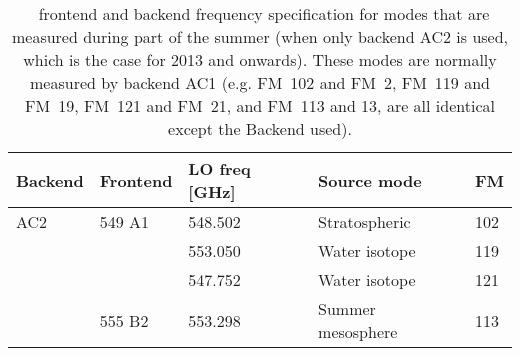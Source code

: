 \begin{table}[tbhp]
\centering
\caption{\smr\ frontend and backend frequency specification for modes that are
    measured during part of the summer (when only backend AC2 is used, which is
    the case for 2013 and onwards).
    These modes are normally measured by backend AC1 (e.g. FM~102 and FM~2,
    FM~119 and FM~19, FM~121 and FM~21, and FM~113 and 13, are all identical
    except the Backend used).
}
\label{table:config3}
\begin{tabular}{lllll}
  \toprule
  \textbf{Backend} & \textbf{Frontend} & \textbf{LO freq [GHz]} & \textbf{Source mode} & \textbf{FM} \\
  \midrule
  AC2              & 549 A1            & 548.502                & Stratospheric        & 102 \\
  \cline{3-3}
  \cline{4-4}
  \cline{5-5}
                   &                   & 553.050                & Water isotope        & 119 \\
  \cline{3-3}
  \cline{4-4}
  \cline{5-5}
                   &                   & 547.752                & Water isotope        & 121 \\
  \cline{2-2}
  \cline{3-3}
  \cline{4-4}
  \cline{5-5}
                   & 555 B2            & 553.298                & Summer mesosphere    & 113 \\
  \bottomrule
\end{tabular}
\end{table}


